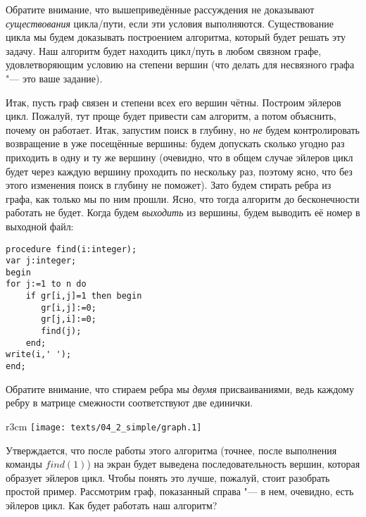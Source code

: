 
Обратите внимание, что вышеприведённые рассуждения не доказывают \textit{существования} цикла/пути, 
если эти условия выполняются. Существование цикла мы будем доказывать построением алгоритма, 
который будет решать эту задачу. Наш алгоритм будет находить цикл/путь в любом связном графе, 
удовлетворяющим условию на степени вершин (что делать для несвязного графа "--- это ваше задание).

Итак, пусть граф связен и степени всех его вершин чётны. Построим эйлеров цикл. Пожалуй, тут проще 
будет привести сам алгоритм, а потом объяснить, почему он работает. Итак, запустим поиск в глубину, 
но \textit{не} будем контролировать возвращение в уже посещённые вершины: будем допускать сколько 
угодно раз приходить в одну и ту же вершину (очевидно, что в общем случае эйлеров цикл будет через 
каждую вершину проходить по нескольку раз, поэтому ясно, что без этого изменения поиск в глубину не 
поможет). Зато будем стирать ребра из графа, как только мы по ним прошли. Ясно, что тогда алгоритм 
до бесконечности работать не будет. Когда будем \textit{выходить} из вершины, будем выводить её 
номер в выходной файл:
\begin{codesampleo}\begin{verbatim}
procedure find(i:integer);
var j:integer;
begin
for j:=1 to n do
    if gr[i,j]=1 then begin
       gr[i,j]:=0;
       gr[j,i]:=0;
       find(j);
    end;
write(i,' ');
end;
\end{verbatim}\end{codesampleo}
Обратите внимание, что стираем ребра мы \textit{двумя} присваиваниями, ведь каждому ребру в матрице 
смежности соответствуют две единички.

\begin{wrapfigure}{r}{3cm}
\vspace{-0.3cm}
\texttt{[image: texts/04\_2\_simple/graph.1]}
\end{wrapfigure}
Утверждается, что после работы этого алгоритма (точнее, после выполнения команды $find(1)$)
на экран будет выведена последовательность вершин, 
которая образует эйлеров цикл. Чтобы понять это лучше, пожалуй, стоит разобрать простой пример.
Рассмотрим граф, показанный справа "--- в нем, очевидно, есть эйлеров цикл. Как будет работать наш 
алгоритм?

